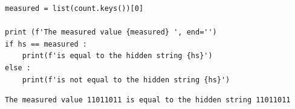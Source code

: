 \begin{lstlisting}[style=python]
measured = list(count.keys())[0]

print (f'The measured value {measured} ', end='')
if hs == measured :
	print(f'is equal to the hidden string {hs}')
else :
	print(f'is not equal to the hidden string {hs}')
\end{lstlisting}
\begin{lstlisting}
The measured value 11011011 is equal to the hidden string 11011011
\end{lstlisting}



